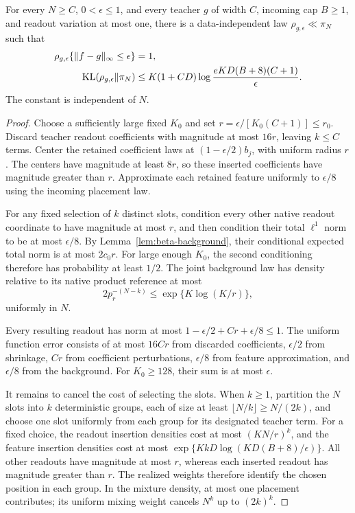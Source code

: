 \begin{lemma}
\label{lem:direct-comparison}
For every $N\ge C$, $0<\epsilon\le1$, and every teacher $g$ of width
$C$, incoming cap $B\ge1$, and readout variation at most one, there is
a data-independent law $\rho_{g,\epsilon}\ll\pi_N$ such that
\begin{align}
 \rho_{g,\epsilon}\{\|f-g\|_\infty\le\epsilon\}&=1,\notag\\
 \mathrm{KL}(\rho_{g,\epsilon}\|\pi_N)
 &\le K(1+CD)\log\frac{eKD(B+8)(C+1)}\epsilon.
 \label{eq:direct-comparison}
\end{align}
The constant is independent of $N$.
\end{lemma}
\begin{proof}
Choose a sufficiently large fixed $K_0$ and set
$r=\epsilon/[K_0(C+1)]\le r_0$. Discard teacher readout coefficients
with magnitude at most $16r$, leaving $k\le C$ terms. Center the
retained coefficient laws at $(1-\epsilon/2)b_j$, with uniform radius
$r$. The centers have magnitude at least $8r$, so these inserted
coefficients have magnitude greater than $r$. Approximate each retained
feature uniformly to $\epsilon/8$ using the incoming placement law.

For any fixed selection of $k$ distinct slots, condition every other
native readout coordinate to have magnitude at most $r$, and then
condition their total $\ell^1$ norm to be at most $\epsilon/8$. By
Lemma~\ref{lem:beta-background}, their conditional expected total norm
is at most $2c_0r$. For large enough $K_0$, the second conditioning
therefore has probability at least $1/2$. The joint background law has
density relative to its native product reference at most
\[
 2p_r^{-(N-k)}\le\exp\{K\log(K/r)\},
\]
uniformly in $N$.

Every resulting readout has norm at most
$1-\epsilon/2+Cr+\epsilon/8\le1$. The uniform function error consists
of at most $16Cr$ from discarded coefficients, $\epsilon/2$ from
shrinkage, $Cr$ from coefficient perturbations, $\epsilon/8$ from
feature approximation, and $\epsilon/8$ from the background. For
$K_0\ge128$, their sum is at most $\epsilon$.

It remains to cancel the cost of selecting the slots. When $k\ge1$,
partition the $N$ slots into $k$ deterministic groups, each of size at
least $\lfloor N/k\rfloor\ge N/(2k)$, and choose one slot uniformly
from each group for its designated teacher term. For a fixed choice,
the readout insertion densities cost at most $(KN/r)^k$, and the
feature insertion densities cost at most
$\exp\{KkD\log(KD(B+8)/\epsilon)\}$. All other readouts have magnitude
at most $r$, whereas each inserted readout has magnitude greater than
$r$. The realized weights therefore identify the chosen position in
each group. In the mixture density, at most one placement contributes;
its uniform mixing weight cancels $N^k$ up to $(2k)^k$.


\end{proof}
